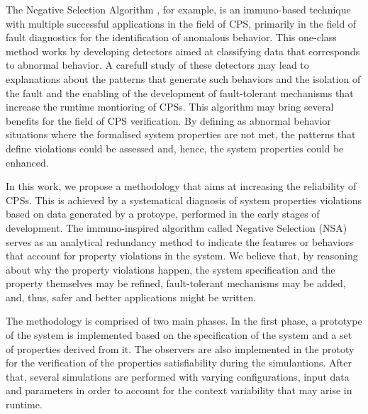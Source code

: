 The Negative Selection Algorithm \cite{ICBook2009}, for example, is an immuno-based technique with multiple successful applications in the field of CPS, primarily in the field of fault diagnostics for the identification of anomalous behavior. This one-class method works by developing detectors aimed at classifying data that corresponds to abnormal behavior. A carefull study of these detectors may lead to explanations about the patterns that generate such behaviors and the isolation of the fault and the enabling of the development of fault-tolerant mechanisms that increase the runtime montioring of CPSs. This algorithm may bring several benefits for the field of CPS verification. By defining as abnormal behavior situations where the formalised system properties are not met, the patterns that define violations could be assessed and, hence, the system properties could be enhanced. 

In this work, we propose a methodology that aims at increasing the reliability of CPSs. This is achieved by a systematical diagnosis of system properties violations based on data generated by a protoype, performed in the early stages of development. The immuno-inspired algorithm called Negative Selection (NSA) serves as an analytical redundancy method to indicate the features or behaviors that account for property violations in the system. We believe that, by reasoning about why the property violations happen, the system specification and the property themselves may be refined, fault-tolerant mechanisms may be added, and, thus, safer and better applications might be written.

The methodology is comprised of two main phases. In the first phase, a prototype of the system is implemented based on the specification of the system and a set of properties derived from it. The observers are also implemented in the prototy for the verification of the properties satisfiability during the simulantions. After that, several simulations are performed with varying configurations, input data and parameters in order to account for the context variability that may arise in runtime. 



